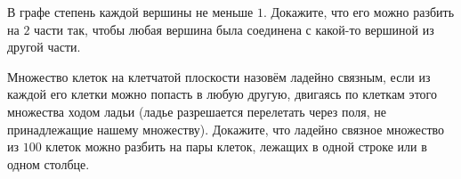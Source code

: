 \begin{problems}
\item В графе степень каждой вершины не меньше $1$. Докажите, что его можно разбить на $2$ части так, чтобы любая вершина была соединена с какой-то вершиной из другой части.

\item Множество клеток на клетчатой плоскости назовём ладейно связным, если из каждой его клетки можно попасть в любую другую, двигаясь по клеткам этого множества ходом ладьи (ладье разрешается перелетать через поля, не принадлежащие нашему множеству). Докажите, что ладейно связное множество из $100$ клеток можно разбить на пары клеток, лежащих в одной строке или в одном столбце.

\end{problems}


